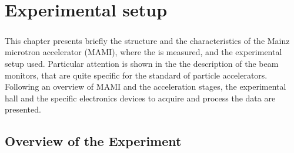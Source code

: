 \chapter{Experimental setup} 

\paragraph{} This chapter presents briefly the structure and the characteristics of the Mainz microtron accelerator (MAMI), where the \transv is measured, and the experimental setup used. Particular attention is shown in the the description of the beam monitors, that are quite specific for the standard of particle accelerators. Following an overview of MAMI and the acceleration stages, the experimental hall and the specific electronics devices to acquire and process the data are presented. 

\section{Overview of the Experiment} \label{FirstDescription}

